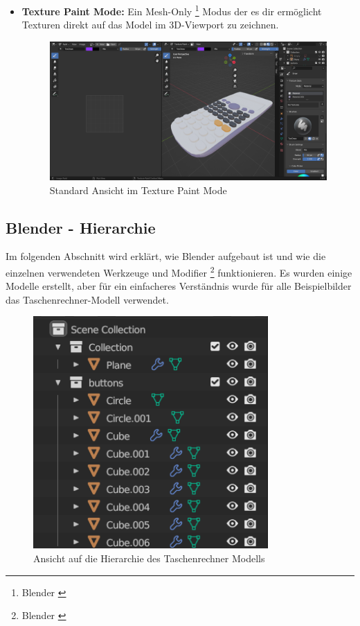 \begin{itemize}
\item \textbf{Texture Paint Mode:} Ein Mesh-Only \footnote{Blender \cite{Mesh}} Modus der es dir ermöglicht Texturen direkt auf das Model im 3D-Viewport
zu zeichnen.
\begin{figure}[h]
\centering
\includegraphics[width=1\textwidth]{images/texturepaintmode.png}
\caption{Standard Ansicht im Texture Paint Mode}
\label{fig:texturepaintmode}
\end{figure}
\end{itemize}

\subsection{Blender - Hierarchie}
Im folgenden Abschnitt wird erklärt, wie Blender aufgebaut ist und wie die einzelnen verwendeten Werkzeuge und Modifier
\footnote{Blender \cite{Modifier}} funktionieren. Es wurden einige Modelle erstellt, aber für ein einfacheres Verständnis
wurde für alle Beispielbilder das Taschenrechner-Modell verwendet.
\begin{figure}[h]
\centering
\includegraphics[width=0.8\textwidth]{images/blenderhierarchy.png}
\caption{Ansicht auf die Hierarchie des Taschenrechner Modells}
\label{fig:blenderhierarchy}
\end{figure}

